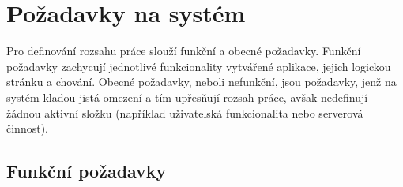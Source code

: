 \section{Požadavky na systém}

Pro definování rozsahu práce slouží funkční a obecné požadavky. Funkční požadavky zachycují jednotlivé funkcionality vytvářené aplikace, jejich logickou stránku a chování. Obecné požadavky, neboli nefunkční, jsou požadavky, jenž na systém kladou jistá omezení a tím upřesňují rozsah práce, avšak nedefinují žádnou aktivní složku (například uživatelská funkcionalita nebo serverová činnost). 


\subsection{Funkční požadavky}

